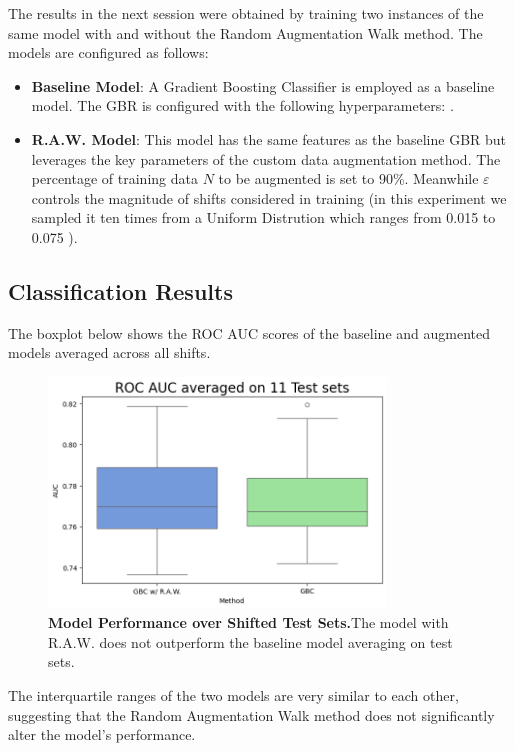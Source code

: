 The results in the next session were obtained by training two instances of the same model with and without the Random Augmentation Walk method. The models are configured as follows:
\begin{itemize}
    \item \textbf{Baseline Model}: A Gradient Boosting Classifier is employed as a baseline model. The GBR is configured with the following hyperparameters: .
    \item \textbf{R.A.W. Model}: This model has the same features as the baseline GBR but leverages the key parameters of the custom data augmentation method. The percentage of training data $N$ to be augmented is set to 90\%. Meanwhile $\varepsilon$ controls the magnitude of shifts considered in training (in this experiment we sampled it ten times from a Uniform Distrution which ranges from 0.015 to 0.075 ).
\end{itemize}

\subsection{Classification Results}


The boxplot below shows the ROC AUC scores of the baseline and augmented models averaged across all shifts.

\begin{figure}[H]
    \centering
    \includegraphics[width=0.8\textwidth]{assets/RealRaw11.png} 
    \caption{\textbf{Model Performance over Shifted Test Sets.}The model with R.A.W. does not outperform the baseline model averaging on test sets.}
\end{figure}

The interquartile ranges of the two models are very similar to each other, suggesting that the Random Augmentation Walk method does not significantly alter the model's performance.


